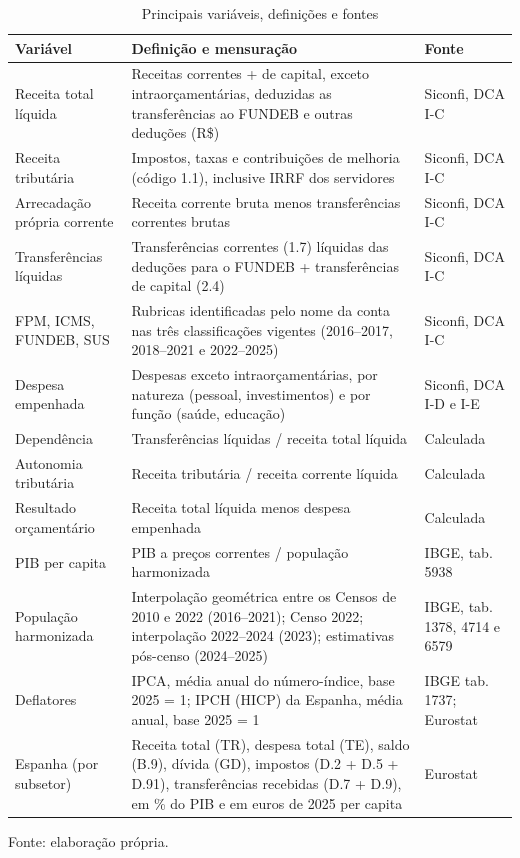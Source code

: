 \begin{table}[htbp]
\centering
\caption{Principais variáveis, definições e fontes}\label{tab:variaveis}
\scriptsize
\begin{tabular}{p{3.1cm}p{8.2cm}p{3.2cm}}
\toprule
Variável & Definição e mensuração & Fonte\\
\midrule
Receita total líquida & Receitas correntes + de capital, exceto intraorçamentárias, deduzidas as transferências ao FUNDEB e outras deduções (R\$) & Siconfi, DCA I-C\\
Receita tributária & Impostos, taxas e contribuições de melhoria (código 1.1), inclusive IRRF dos servidores & Siconfi, DCA I-C\\
Arrecadação própria corrente & Receita corrente bruta menos transferências correntes brutas & Siconfi, DCA I-C\\
Transferências líquidas & Transferências correntes (1.7) líquidas das deduções para o FUNDEB + transferências de capital (2.4) & Siconfi, DCA I-C\\
FPM, ICMS, FUNDEB, SUS & Rubricas identificadas pelo nome da conta nas três classificações vigentes (2016--2017, 2018--2021 e 2022--2025) & Siconfi, DCA I-C\\
Despesa empenhada & Despesas exceto intraorçamentárias, por natureza (pessoal, investimentos) e por função (saúde, educação) & Siconfi, DCA I-D e I-E\\
Dependência & Transferências líquidas / receita total líquida & Calculada\\
Autonomia tributária & Receita tributária / receita corrente líquida & Calculada\\
Resultado orçamentário & Receita total líquida menos despesa empenhada & Calculada\\
PIB per capita & PIB a preços correntes / população harmonizada & IBGE, tab. 5938\\
População harmonizada & Interpolação geométrica entre os Censos de 2010 e 2022 (2016--2021); Censo 2022; interpolação 2022--2024 (2023); estimativas pós-censo (2024--2025) & IBGE, tab. 1378, 4714 e 6579\\
Deflatores & IPCA, média anual do número-índice, base 2025 = 1; IPCH (HICP) da Espanha, média anual, base 2025 = 1 & IBGE tab. 1737; Eurostat\\
Espanha (por subsetor) & Receita total (TR), despesa total (TE), saldo (B.9), dívida (GD), impostos (D.2 + D.5 + D.91), transferências recebidas (D.7 + D.9), em \% do PIB e em euros de 2025 per capita & Eurostat\\
\bottomrule
\end{tabular}
\par\smallskip
\begin{minipage}{0.97\textwidth}\scriptsize Fonte: elaboração própria.\end{minipage}
\end{table}

